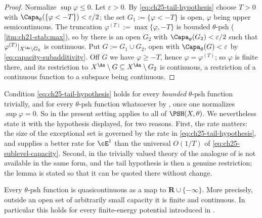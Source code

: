 \begin{proof}
Normalize $\sup\varphi\leq0$.  Let $\varepsilon>0$.  By
\eqref{eq:ch25-tail-hypothesis} choose $T>0$ with
$\Capa_\theta(\{\varphi<-T\})<\varepsilon/2$; the set
$G_1:=\{\varphi<-T\}$ is open, $\varphi$ being upper semicontinuous.  The
truncation $\varphi^{(T)}:=\max\{\varphi,-T\}$ is bounded $\theta$-psh
(\,\cref{itm:ch21-stab:max}), so by
 there is an open $G_2$ with
$\Capa_\theta(G_2)<\varepsilon/2$ such that
$\varphi^{(T)}|_{X^{\An}\setminus G_2}$ is continuous.  Put
$G:=G_1\cup G_2$, open with $\Capa_\theta(G)<\varepsilon$ by
\eqref{eq:capacity-subadditivity}.  Off $G$ we have $\varphi\geq-T$,
hence $\varphi=\varphi^{(T)}$; so $\varphi$ is finite there, and its
restriction to $X^{\An}\setminus G\subseteq X^{\An}\setminus G_2$ is
continuous, a restriction of a continuous function to a subspace being
continuous.
\end{proof}

\begin{remark}
\label{rem:ch25-tail-not-automatic}
Condition \eqref{eq:ch25-tail-hypothesis} holds for every \emph{bounded}
$\theta$-psh function trivially, and for every $\theta$-psh function
whatsoever by , once one normalizes
$\sup\varphi=0$.  So in the present setting
 applies to all of
$\PSH(X,\theta)$.  We nevertheless state it with the hypothesis displayed,
for two reasons.  First, the rate matters: the size of the exceptional set
is governed by the rate in \eqref{eq:ch25-tail-hypothesis}, and
 supplies a better rate for $\cE^1$ than the
universal $O(1/T)$ of \eqref{eq:ch25-sublevel-capacity}.  Second, in the
trivially valued theory of  the analogue of
 is not available in the same form, and
the tail hypothesis is then a genuine restriction; the lemma is stated so
that it can be quoted there without change.
\end{remark}

\begin{theorem}
\label{thm:ch25-psh-quasicontinuity}
\label{thm:e1-quasicontinuity}
Every $\theta$-psh function is quasicontinuous as a map to
$\mathbf R\cup\{-\infty\}$.  More precisely, outside an open set of
arbitrarily small capacity it is finite and continuous.  In particular this
holds for every finite-energy potential introduced in
.
\end{theorem}

